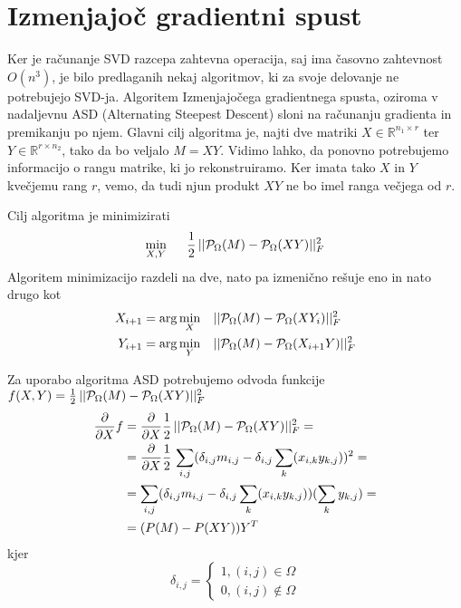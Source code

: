 \section{Izmenjajoč gradientni spust}
Ker je računanje SVD razcepa zahtevna operacija, saj ima časovno zahtevnost
$O(n^3)$, je bilo predlaganih nekaj algoritmov, ki za svoje delovanje ne potrebujejo SVD-ja. Algoritem Izmenjajočega gradientnega spusta, oziroma v nadaljevnu ASD (Alternating Steepest Descent) sloni na računanju gradienta in premikanju po njem. Glavni cilj algoritma je, najti dve matriki $X \in \mathbb{R}^{n_1 \times r}$ ter $Y \in \mathbb{R}^{r \times n_2}$, tako da bo veljalo $M = XY$. Vidimo lahko, da ponovno potrebujemo informacijo o rangu matrike, ki jo rekonstruiramo. Ker imata tako $X$ in $Y$ kvečjemu rang $r$, vemo, da tudi njun produkt $XY$ ne bo imel ranga večjega od $r$. 

Cilj algoritma je minimizirati 
\[
    \min_{X, Y} \hspace{0.5cm} \frac{1}{2}\, ||\mathcal{P}_\Omega(M) - \mathcal{P}_\Omega(XY)||^2_F
\] 
Algoritem minimizacijo razdeli na dve, nato pa izmenično rešuje eno in nato drugo kot 
\begin{align*}
    X_{i+1} &= \arg \min_{X} \hspace{0.3cm} ||\mathcal{P}_\Omega(M) - \mathcal{P}_\Omega(XY_i)||^2_F \\
    Y_{i+1} &= \arg \min_{Y} \hspace{0.3cm} ||\mathcal{P}_\Omega(M) - \mathcal{P}_\Omega(X_{i+1}Y)||^2_F
\end{align*}
\cite{AST-TK15}

Za uporabo algoritma ASD potrebujemo odvoda funkcije $f(X,Y) = \frac{1}{2}\, ||\mathcal{P}_\Omega(M) - \mathcal{P}_\Omega(XY)||^2_F$ 
\begin{align*}
    \frac{\partial}{\partial X} f &= \frac{\partial}{\partial X} \frac{1}{2}\, ||\mathcal{P}_\Omega(M) - \mathcal{P}_\Omega(XY)||^2_F = \\
    &= \frac{\partial}{\partial X} \frac{1}{2}\, \sum_{i,j}(\delta_{i,j}m_{i,j} - \delta_{i,j}\sum_{k}(x_{i,k}y_{k,j}))^2 = \\
    &= \sum_{i,j}(\delta_{i,j}m_{i,j} - \delta_{i,j}\sum_{k}(x_{i,k}y_{k,j}))
    (\sum_{k}y_{k,j}) = \\
    &= (P(M) - P(XY))Y^T
\end{align*}
kjer 
\[
    \delta_{i,j} = \begin{cases}
        1, (i, j) \in \Omega \\
        0, (i, j) \notin \Omega
    \end{cases}
\]